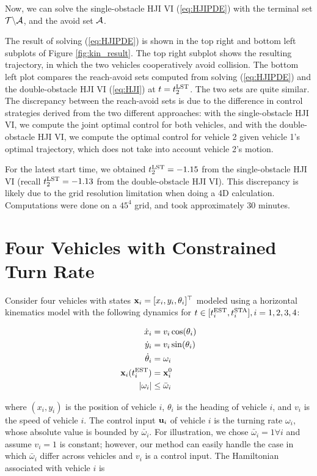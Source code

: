Now, we can solve the single-obstacle HJI VI (\ref{eq:HJIPDE}) with the terminal set  $\mathcal{T}\backslash\mathcal{A}$, and the avoid set $\mathcal{A}$.

The result of solving (\ref{eq:HJIPDE}) is shown in the top right and bottom left subplots of Figure \ref{fig:kin_result}. The top right subplot shows the resulting trajectory, in which the two vehicles cooperatively avoid collision. The bottom left plot compares the reach-avoid sets computed from solving (\ref{eq:HJIPDE}) and the double-obstacle HJI VI (\ref{eq:HJI}) at $t=t^{\text{LST}}_2$. The two sets are quite similar. The discrepancy between the reach-avoid sets is due to the difference in control strategies derived from the two different approaches: with the single-obstacle HJI VI, we compute the joint optimal control for both vehicles, and with the double-obstacle HJI VI, we compute the optimal control for vehicle 2 given vehicle 1's optimal trajectory, which does not take into account vehicle 2's motion. 

For the latest start time, we obtained $t^{\text{LST}}_2 = -1.15$ from the single-obstacle HJI VI (recall $t^{\text{LST}}_2=-1.13$ from the double-obstacle HJI VI). This discrepancy is likely due to the grid resolution limitation when doing a 4D calculation. Computations were done on a $45^4$ grid, and took approximately 30 minutes.

\section{Four Vehicles with Constrained Turn Rate}
Consider four vehicles with states $\mathbf{x}_i = [x_i, y_i, \theta_i]^\top$ modeled using a horizontal kinematics model with the following dynamics for $t \in[t^{\text{EST}}_i, t^{\text{STA}}_i],i=1,2,3,4$:

\begin{equation}
\begin{aligned}
\dot{x}_i &= v_i \cos(\theta_i) \\
\dot{y}_i &= v_i \sin(\theta_i) \\
\dot{\theta}_i &= \omega_i \\
\mathbf{x}_i(t^{\text{EST}}_i) &= \mathbf{x}_i^0 \\
|\omega_i| &\le \bar{\omega}_i \\
\end{aligned}
\end{equation}

\noindent where $(x_i, y_i)$ is the position of vehicle $i$, $\theta_i$ is the heading of vehicle $i$, and $v_i$ is the speed of vehicle $i$. The control input $\mathbf{u}_i$ of vehicle $i$ is the turning rate $\omega_i$, whose absolute value is bounded by $\bar{\omega}_i$. For illustration, we chose $\bar{\omega}_i=1 \forall i$ and assume $v_i=1$ is constant; however, our method can easily handle the case in which $\bar{\omega}_i$ differ across vehicles and $v_i$ is a control input. The Hamiltonian associated with vehicle $i$ is


